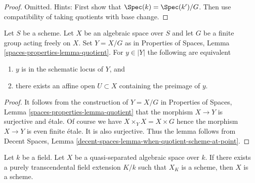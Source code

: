\begin{proof}
Omitted. Hints: First show that $\Spec(k) = \Spec(k')/G$.
Then use compatibility of taking quotients with base change.
\end{proof}

\begin{lemma}
\label{lemma-when-quotient-scheme-at-point}
Let $S$ be a scheme. Let $X$ be an algebraic space over $S$ and
let $G$ be a finite group acting freely on $X$. Set $Y = X/G$ as
in Properties of Spaces, Lemma \ref{spaces-properties-lemma-quotient}.
For $y \in |Y|$ the following are equivalent
\begin{enumerate}
\item $y$ is in the schematic locus of $Y$, and
\item there exists an affine open $U \subset X$
containing the preimage of $y$.
\end{enumerate}
\end{lemma}

\begin{proof}
It follows from the construction of $Y = X/G$ in
Properties of Spaces, Lemma \ref{spaces-properties-lemma-quotient}
that the morphism $X \to Y$ is surjective and \'etale.
Of course we have $X \times_Y X = X \times G$ hence the morphism
$X \to Y$ is even finite \'etale. It is also surjective.
Thus the lemma follows from
Decent Spaces, Lemma \ref{decent-spaces-lemma-when-quotient-scheme-at-point}.
\end{proof}

\begin{lemma}
\label{lemma-scheme-after-purely-transcendental-base-change}
Let $k$ be a field. Let $X$ be a quasi-separated
algebraic space over $k$. If there exists a purely transcendental
field extension $K/k$ such that $X_K$ is a scheme, then
$X$ is a scheme.
\end{lemma}


